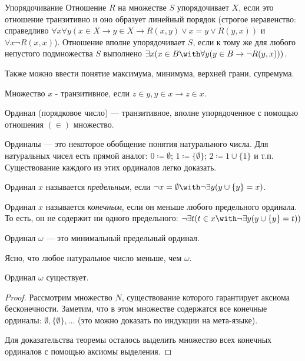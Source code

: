 \begin{definition}{Упорядочивание}
Отношение $R$ на множестве $S$ упорядочивает $X$, если это отношение
транзитивно и оно образует линейный порядок 
(строгое неравенство: справедливо
$\forall x \forall y (x \in X \rightarrow y \in X \rightarrow R(x,y) \vee x =
y \vee R(y,x))$ и
$\forall x \neg R(x,x)$).
Отношение вполне упорядочивает $S$, если к тому же для любого 
непустого подмножества $S$ выполнено 
$\exists x (x \in B \with \forall y (y \in B \rightarrow \neg R(y,x)))$.
\end{definition}

Также можно ввести понятие максимума, минимума, верхней грани, супремума.

\begin{definition}
Множество $x$ - транзитивное, если $z \in y, y \in x \rightarrow z \in x$.
\end{definition}

\begin{definition}
Ординал (порядковое число) --- транзитивное, вполне упорядоченное с 
помощью отношения $(\in)$ множество.
\end{definition}

Ординалы --- это некоторое обобщение понятия натурального числа.
Для натуральных чисел есть прямой аналог:
$0 \coloneqq  \emptyset$; $1 \coloneqq  \{\emptyset\}$; $2 \coloneqq  1 \cup \{1\}$ и т.п.
Существование каждого из этих ординалов легко доказать.

\begin{definition}Ординал $x$ называется \emph{предельным}, если 
$\neg x = \emptyset \with \neg \exists y (y \cup \{y\} = x)$.
\end{definition}

\begin{definition}Ординал $x$ называется \emph{конечным}, если
он меньше любого предельного ординала. То есть, он не содержит
ни одного предельного:
$\neg\exists t (t \in x \with \neg \exists y (y \cup \{y\} = t))$
\end{definition}

\begin{definition}Ординал $\omega$ --- это минимальный
предельный ординал.
\end{definition}

Ясно, что любое натуральное число меньше, чем $\omega$. 

\begin{theorem}Ординал $\omega$ существует.
\end{theorem}
\begin{proof}
Рассмотрим множество $N$, существование которого гарантирует аксиома 
бесконечности. Заметим, что в этом множестве содержатся все конечные ординалы: 
$\emptyset, \{\emptyset\}, \dots$ (это можно доказать по индукции на
мета-языке).

Для доказательства теоремы осталось выделить множество всех конечных ординалов 
с помощью аксиомы выделения.
\end{proof}

